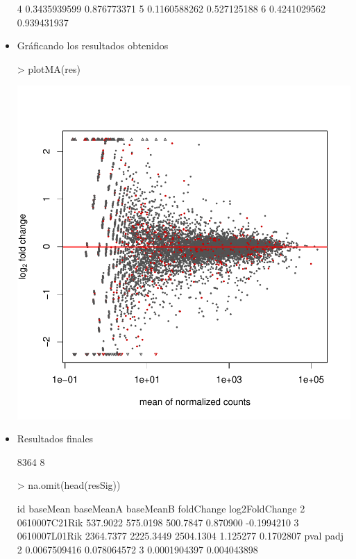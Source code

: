 \documentclass{article}
\begin{document}
\begin{itemize}
\begin{Schunk}
\begin{Soutput}
4 0.3435939599 0.876773371
5 0.1160588262 0.527125188
6 0.4241029562 0.939431937
\end{Soutput}
\end{Schunk}
\item{Gráficando los resultados obtenidos}
\begin{Schunk}
\begin{Sinput}
> plotMA(res)
\end{Sinput}
\end{Schunk}
\includegraphics{JuanHenao_Taller3A-008}
\item{Resultados finales}
\begin{Schunk}
\begin{Soutput}
[1] 8364    8
\end{Soutput}
\begin{Sinput}
> na.omit(head(resSig))
\end{Sinput}
\begin{Soutput}
             id  baseMean baseMeanA baseMeanB foldChange log2FoldChange
2 0610007C21Rik  537.9022  575.0198  500.7847   0.870900     -0.1994210
3 0610007L01Rik 2364.7377 2225.3449 2504.1304   1.125277      0.1702807
          pval        padj
2 0.0067509416 0.078064572
3 0.0001904397 0.004043898
\end{Soutput}
\end{Schunk}
\end{itemize}
\end{document}
